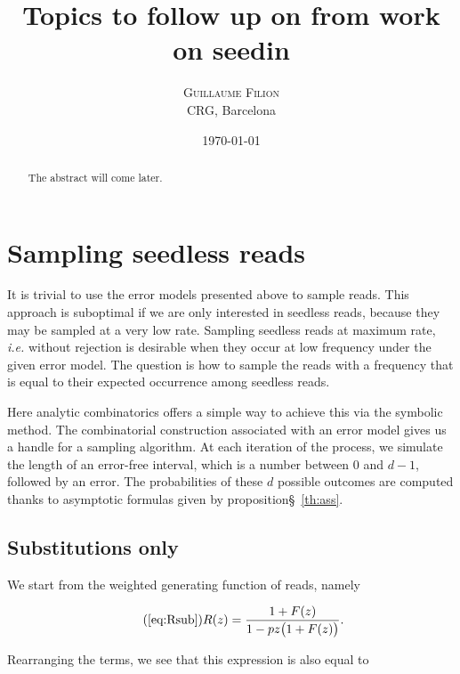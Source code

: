 \documentclass{article}
\title{Topics to follow up on from work on seedin}
\author{
\textsc{Guillaume Filion} \\ [1ex]
\normalsize CRG, Barcelona
}
\date{\today}
\begin{document}
\maketitle

\begin{abstract}
The abstract will come later.
\end{abstract}






\section{Sampling seedless reads}

It is trivial to use the error models presented above to sample reads.
This approach is suboptimal if we are only interested in seedless
reads, because they may be sampled at a very low rate. Sampling
seedless reads at maximum rate, \textit{i.e.} without rejection is
desirable when they occur at low frequency under the given error model.
The question is how to sample the reads with a frequency that is equal to
their expected occurrence among seedless reads.

Here analytic combinatorics offers a simple way to achieve this via the
symbolic method. The combinatorial construction associated with an
error model gives us a handle for a sampling algorithm. At each iteration
of the process, we simulate the length of an error-free interval, which is
a number between $0$ and $d-1$, followed by an error. The probabilities
of these $d$ possible outcomes are computed thanks to asymptotic formulas
given by proposition§~\ref{th:ass}.




\subsection{Substitutions only}
\label{sec:smplsub}

We start from the weighted generating function of reads, namely

\begin{equation}
\tag{\ref{eq:Rsub}}
R(z) = \frac{1+F(z)}{1-pz\big( 1+F(z) \big)}.
\end{equation}

Rearranging the terms, we see that this expression is also equal to
\end{document}
